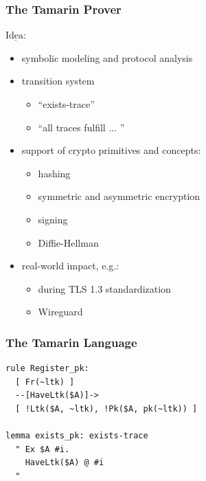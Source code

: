 \documentclass{beamer}
\begin{document}
\begin{frame}
\frametitle{The Tamarin Prover}
$\underline{\text{Idea:}}$
\begin{itemize}
	\item symbolic modeling and protocol analysis
	\pause
	\item transition system
	\begin{itemize}
		\item ``exists-trace''
		\item ``all traces fulfill ... ''
	\end{itemize}
	\pause
	\item support of crypto primitives and concepts:
	\begin{itemize}
		\item hashing
		\item symmetric and asymmetric encryption
		\item signing
		\item Diffie-Hellman
	\end{itemize}
	\pause
	\item real-world impact, e.g.:
	\begin{itemize}
		\item during TLS 1.3 standardization
		\item Wireguard
	\end{itemize}
\end{itemize}
\end{frame}

\begin{frame}[fragile]
\frametitle{The Tamarin Language}

\begin{lstlisting}[language=Tamarin]
rule Register_pk:
  [ Fr(~ltk) ]
  --[HaveLtk($A)]->
  [ !Ltk($A, ~ltk), !Pk($A, pk(~ltk)) ]

lemma exists_pk: exists-trace
  " Ex $A #i.
    HaveLtk($A) @ #i
  "
\end{lstlisting}

\end{frame}
\end{document}
